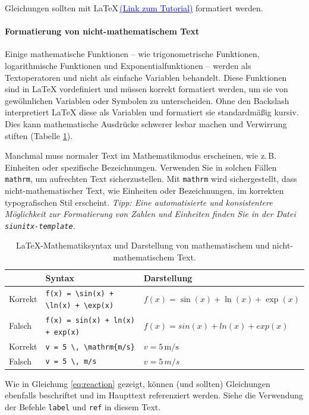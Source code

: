 \documentclass[
	german,
	accentcolor=9c,%
	type=intern,
	marginpar=false
	]{tudapub}
\begin{document}
Gleichungen sollten mit \LaTeX\,\href{https://www.overleaf.com/learn/latex/Learn_LaTeX_in_30_minutes#Adding_math_to_LaTeX}{\textcolor{blue}{(Link zum Tutorial)}} formatiert werden.

\paragraph{Formatierung von nicht-mathematischem Text}         %
Einige mathematische Funktionen – wie trigonometrische Funktionen, logarithmische Funktionen und Exponentialfunktionen – werden als Textoperatoren und nicht als einfache Variablen behandelt. Diese Funktionen sind in LaTeX vordefiniert und müssen korrekt formatiert werden, um sie von gewöhnlichen Variablen oder Symbolen zu unterscheiden. Ohne den Backslash interpretiert LaTeX diese als Variablen und formatiert sie standardmäßig kursiv. Dies kann mathematische Ausdrücke schwerer lesbar machen und Verwirrung stiften (Tabelle \ref{tab:functions}).

Manchmal muss normaler Text im Mathematikmodus erscheinen, wie z.\,B. Einheiten oder spezifische Bezeichnungen. Verwenden Sie in solchen Fällen \texttt{mathrm}, um aufrechten Text sicherzustellen. Mit \texttt{mathrm} wird sichergestellt, dass nicht-mathematischer Text, wie Einheiten oder Bezeichnungen, im korrekten typografischen Stil erscheint. \emph{Tipp: Eine automatisierte und konsistentere Möglichkeit zur Formatierung von Zahlen und Einheiten finden Sie in der Datei \texttt{siunitx-template}.}

\begin{table}[h!]
\centering
\begin{tabular}{lll}
\toprule
    &    Syntax & Darstellung \\
\midrule
Korrekt & \verb|f(x) = \sin(x) + \ln(x) + \exp(x)| & $ f(x) = \sin(x) + \ln(x) + \exp(x) $  \\
Falsch & \verb|f(x) = sin(x) + ln(x) + exp(x)| & $ f(x) = sin(x) + ln(x) + exp(x) $  \\
\midrule
Korrekt & \verb|v = 5 \, \mathrm{m/s}| & $ v = 5 \, \mathrm{m/s} $  \\
Falsch & \verb|v = 5 \, m/s| & $ v = 5 \, m/s $  \\
\bottomrule
\end{tabular}
\caption{LaTeX-Mathematiksyntax und Darstellung von mathematischem und nicht-mathematischem Text.}
\label{tab:functions}
\end{table}

Wie in Gleichung \eqref{eq:reaction} gezeigt, können (und sollten) Gleichungen ebenfalls beschriftet und im Haupttext referenziert werden. Siehe die Verwendung der Befehle \texttt{label} und \texttt{ref} in diesem Text.
\end{document}
